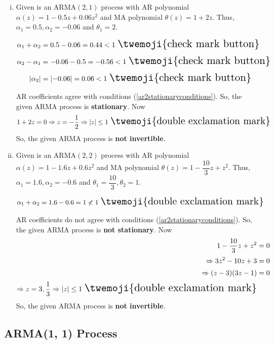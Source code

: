 \documentclass[11pt, a4paper]{article}
\numberwithin{equation}{section}
\theoremstyle{definition}
\begin{document}
\begin{enumerate}[(i)]
\item Given is an ARMA$(2, 1)$ process with AR polynomial $\alpha(z) = 1 - 0.5 z + 0.06 z^2$ and MA polynomial $\theta(z) = 1 + 2z$. Thus, $\alpha_1 = 0.5, \alpha_2 = -0.06$ and $\theta_1 = 2$.

\begin{align*}
\alpha_1 + \alpha_2 &= 0.5 - 0.06 = 0.44 < 1 \,\, \scalebox{1.5}{\twemoji{check mark button}} \\[0.5em]
\alpha_2 - \alpha_1 &= - 0.06 - 0.5 = - 0.56 < 1 \,\, \scalebox{1.5}{\twemoji{check mark button}} \\[0.5em]
|\alpha_2| &= \left|-0.06\right| = 0.06 < 1 \,\, \scalebox{1.5}{\twemoji{check mark button}}
\end{align*}

AR coefficients agree with conditions (\ref{ar2stationaryconditions}). So, the given ARMA process is \textbf{stationary}. Now
$$1 + 2z = 0 \Rightarrow z = - \dfrac{1}{2} \Rightarrow |z| \leq 1 \,\, \scalebox{1.5}{\twemoji{double exclamation mark}}$$
So, the given ARMA process is \textbf{not invertible}.


\item Given is an ARMA$(2, 2)$ process with AR polynomial $\alpha(z) = 1 - 1.6 z + 0.6 z^2$ and MA polynomial $\theta(z) = 1 - \dfrac{10}{3} z + z^2$. Thus, $\alpha_1 = 1.6, \alpha_2 = -0.6$ and $\theta_1 = \dfrac{10}{3}, \theta_2 = 1$.

\begin{align*}
\alpha_1 + \alpha_2 &= 1.6 - 0.6 = 1 \nless 1 \,\, \scalebox{1.5}{\twemoji{double exclamation mark}}
\end{align*}

AR coefficients do not agree with conditions (\ref{ar2stationaryconditions}). So, the given ARMA process is \textbf{not stationary}. Now
\begin{align*}
1 - \dfrac{10}{3} z + z^2 &= 0 \\[0.2em]
\Rightarrow 3z^2 - 10 z + 3 &= 0 \\[0.2em]
\Rightarrow (z-3) (3z-1) &= 0 \\[0.2em]
\Rightarrow z = 3, \dfrac{1}{3} \Rightarrow |z| \leq 1 \,\, \scalebox{1.5}{\twemoji{double exclamation mark}}
\end{align*}
So, the given ARMA process is \textbf{not invertible}.
\end{enumerate}

\subsection{ARMA(1, 1) Process}
\end{document}
